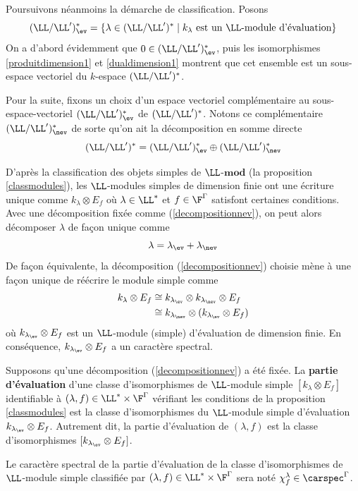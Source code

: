 Poursuivons néanmoins la démarche de classification. Posons 
$$ (\LL/\LL')_{\ev}^* = \{\lambda \in (\LL/\LL')^* \; | \; k_\lambda \text{ est un $\LL$-module d'évaluation}\} $$
On a d'abord évidemment que $0 \in (\LL/\LL')_{\ev}^*$, puis les isomorphismes \ref{produitdimension1} et \ref{dualdimension1} montrent que cet ensemble est un sous-espace vectoriel du $k$-espace $(\LL/\LL')^*$.

Pour la suite, fixons un choix d'un espace vectoriel complémentaire au sous-espace-vectoriel $(\LL/\LL')_{\ev}^*$ de $(\LL/\LL')^*$. Notons ce complémentaire $(\LL/\LL')_{\nev}^*$ de sorte qu'on ait la décomposition en somme directe 
\begin{equation} \label{decompositionnev}
(\LL/\LL')^* = (\LL/\LL')_{\ev}^* \oplus (\LL/\LL')_{\nev}^*
\end{equation}

D'après la classification des objets simples de $\LL$-$\mathbf{mod}$ (la proposition \ref{classmodules}), les $\LL$-modules simples de dimension finie ont une écriture unique comme $k_\lambda \otimes E_f$ où $\lambda \in \LL^*$ et $f \in \F^\Gamma$ satisfont certaines conditions. Avec une décomposition fixée comme (\ref{decompositionnev}), on peut alors décomposer $\lambda$ de façon unique comme 
$$ \lambda = \lambda_{\ev} + \lambda_{\nev} $$ 
De façon équivalente, la décomposition (\ref{decompositionnev}) choisie mène à une façon unique de réécrire le module simple comme 
\begin{align*}
k_\lambda \otimes E_f &\cong k_{\lambda_{\ev}} \otimes k_{\lambda_{\nev}} \otimes E_f\\
&\cong k_{\lambda_{\nev}} \otimes (k_{\lambda_{\ev}} \otimes E_f)
\end{align*}
où $k_{\lambda_{\ev}} \otimes E_f$ est un $\LL$-module (simple) d'évaluation de dimension finie. En conséquence, $k_{\lambda_{\ev}} \otimes E_f$ a un caractère spectral.

\begin{Def} \label{partieeval} Supposons qu'une décomposition (\ref{decompositionnev}) a été fixée. La \textbf{partie d'évaluation} d'une classe d'isomorphismes de $\LL$-module simple $[k_\lambda \otimes E_f]$ identifiable à $(\lambda,f) \in \LL^* \times \F^\Gamma$ vérifiant les conditions de la proposition \ref{classmodules} est la classe d'isomorphismes du $\LL$-module simple d'évaluation $k_{\lambda_{\ev}} \otimes E_f$. Autrement dit, la partie d'évaluation de $(\lambda,f)$ est la classe d'isomorphismes $[k_{\lambda_{\ev}} \otimes E_f]$. 

Le caractère spectral de la partie d'évaluation de la classe d'isomorphismes de $\LL$-module simple classifiée par $(\lambda,f) \in \LL^* \times \F^\Gamma$ sera noté $\chi_f^\lambda \in \carspec^\Gamma$. 
\end{Def}

